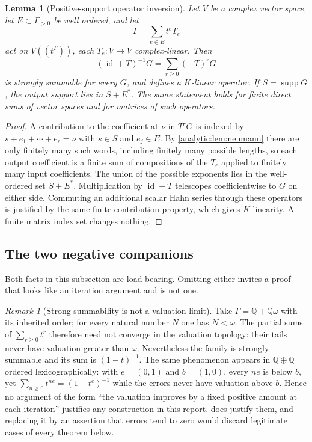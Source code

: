 \documentclass[11pt,letterpaper]{article}
\newtheorem{lemma}[theorem]{Lemma}
\theoremstyle{definition}
\theoremstyle{remark}
\newtheorem{remark}[theorem]{Remark}
\newcommand{\Q}{\mathbb Q}
\newcommand{\supp}{\operatorname{supp}}
\newcommand{\id}{\operatorname{id}}
\numberwithin{equation}{section}
\begin{document}
\begin{lemma}[Positive-support operator inversion]
\label{analytic:lem:operator}
Let $V$ be a complex vector space, let $E\subset\Gamma_{>0}$ be well
ordered, and let
\[
 T=\sum_{e\in E}t^eT_e
\]
act on $V((t^\Gamma))$, each $T_e:V\to V$ complex-linear. Then
\begin{equation}\label{analytic:eq:operator-inverse}
 (\id+T)^{-1}G=\sum_{r\ge0}(-T)^rG
\end{equation}
is strongly summable for every $G$, and defines a $K$-linear operator. If
$S=\supp G$, the output support lies in $S+E^*$. The same statement holds
for finite direct sums of vector spaces and for matrices of such operators.
\end{lemma}
\begin{proof}
A contribution to the coefficient at $\nu$ in $T^rG$ is indexed by
$s+e_1+\cdots+e_r=\nu$ with $s\in S$ and $e_j\in E$. By
\cref{analytic:lem:neumann} there are only finitely many such words,
including finitely many possible lengths, so each output coefficient is a
finite sum of compositions of the $T_e$ applied to finitely many input
coefficients. The union of the possible exponents lies in the well-ordered
set $S+E^*$. Multiplication by $\id+T$ telescopes coefficientwise to $G$ on
either side. Commuting an additional scalar Hahn series through these
operators is justified by the same finite-contribution property, which
gives $K$-linearity. A finite matrix index set changes nothing.
\end{proof}

\subsection{The two negative companions}\label{analytic:subsec:negatives}
Both facts in this subsection are load-bearing. Omitting either invites a
proof that looks like an iteration argument and is not one.

\begin{remark}[Strong summability is not a valuation limit]
\label{analytic:rem:rank}
Take $\Gamma=\Q+\Q\omega$ with its inherited order; for every natural
number $N$ one has $N<\omega$. The partial sums of $\sum_{r\ge0}t^r$
therefore need not converge in the valuation topology: their tails never
have valuation greater than $\omega$. Nevertheless the family is strongly
summable and its sum is $(1-t)^{-1}$. The same phenomenon appears in
$\Q\oplus\Q$ ordered lexicographically: with $e=(0,1)$ and $b=(1,0)$, every
$ne$ is below $b$, yet $\sum_{n\ge0}t^{ne}=(1-t^e)^{-1}$ while the errors
never have valuation above $b$. Hence no argument of the form ``the
valuation improves by a fixed positive amount at each iteration'' justifies
any construction in this report.  does justify
them, and replacing it by an assertion that errors tend to zero would
discard legitimate cases of every theorem below.
\end{remark}
\end{document}
